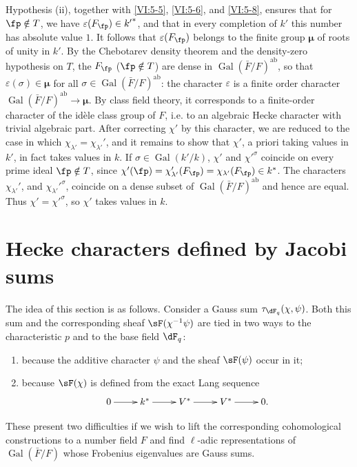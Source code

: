 \documentclass[oneside]{book}
\DeclareMathOperator{\gal}{Gal}
\newcommand{\dmu}{{\bm\mu}}
\newcounter{char}
\theoremstyle{sga-source}
\theoremstyle{sga-source-dash}
\theoremstyle{sga-source-dotdash}
\theoremstyle{sga-source-number-note-dash}
\theoremstyle{sga-source-note-number-dotdash}
\theoremstyle{sga-source-example-dotdash}
\theoremstyle{sga-source-inline-number}
\theoremstyle{sga-source-bare-number}
\theoremstyle{sga-source}
\newcommand{\PrintPage}[1]{}\newcommand{\MathPage}[1]{}\newcommand{\PrintCite}[2]{#1}\newcommand{\var}[3]{#1}
\begin{document}
Hypothesis (ii), together with \ref{VI:5-5}, \ref{VI:5-6}, and \ref{VI:5-8}, ensures that 
for $\fp\notin T$, we have $\varepsilon(F_\fp)\in {k'}^\ast$, and that in every 
completion of $k'$ this number has absolute value $1$. It follows that 
$\varepsilon(F_\fp)$ belongs to the finite group $\dmu$ of roots of unity 
in $k'$. By the Chebotarev density theorem and the density-zero hypothesis 
on $T$, the $F_\fp$ ($\fp\notin T$) are dense in 
  $\gal(\bar F/F)^\text{ab}$, so that $\varepsilon(\sigma)\in \dmu$ for all 
$\sigma\in \gal(\bar F/F)^\text{ab}$: the character $\varepsilon$ is a 
  finite order character $\gal(\bar F/F)^\text{ab}\to \dmu$. By 
class field theory, it corresponds to a finite-order character 
of the idèle class group of $F$, i.e. to an algebraic Hecke character 
with trivial algebraic part. After correcting $\chi'$ by this 
character, we are reduced to the case in which 
$\chi_{\lambda'}=\chi_{\lambda'}'$, and it remains to show that $\chi'$, 
a priori taking values in $k'$, in fact takes values in $k$. If 
$\sigma\in \gal(k'/k)$, $\chi'$ and ${\chi'}^\sigma$ coincide on every prime 
ideal $\fp\notin T$, since 
$\chi'(\fp) = \chi'_{\lambda'}(F_\fp) = \chi_{\lambda'}(F_\fp) \in k^\ast$. 
The characters $\chi_{\lambda'}'$, and ${\chi_{\lambda'}'}^\sigma$, coincide 
on a dense subset of $\gal(\bar F/F)^\text{ab}$ and hence are equal. Thus 
$\chi'={\chi'}^\sigma$, so $\chi'$ takes values in $k$. 










\PrintPage{213}
\section{Hecke characters defined by Jacobi sums}\label{VI:6}

The idea of this section is as follows. Consider a Gauss sum 
$\tau_{\dF_q}(\chi,\psi)$. Both this sum and the corresponding sheaf 
$\sF(\chi^{-1}\psi)$ are tied in two ways to the characteristic $p$ and to the 
base field $\dF_q$: 
\begin{enumerate}[\indent a)]
  \item because the additive character $\psi$ and the sheaf 
    $\sF(\psi)$ occur in it; 
  \item because $\sF(\chi)$ is defined from the exact Lang sequence 
    \[\xymatrix{
      0 \ar[r] 
        & k^\ast \ar[r] 
        & V^\ast \ar[r] 
        & V^\ast \ar[r] 
        & 0 \text{.} 
    }\]
\end{enumerate}
These present two difficulties if we wish to lift the corresponding 
cohomological constructions to a number field $F$ and find 
$\ell$-adic representations of $\gal(\bar F/F)$ whose Frobenius eigenvalues 
are Gauss sums. 
\end{document}
